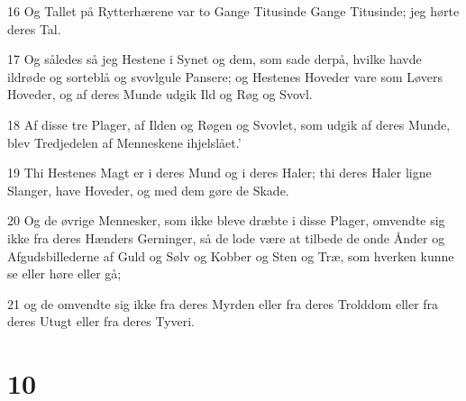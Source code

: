 \par 16 Og Tallet på Rytterhærene var to Gange Titusinde Gange Titusinde; jeg hørte deres Tal.
\par 17 Og således så jeg Hestene i Synet og dem, som sade derpå, hvilke havde ildrøde og sorteblå og svovlgule Pansere; og Hestenes Hoveder vare som Løvers Hoveder, og af deres Munde udgik Ild og Røg og Svovl.
\par 18 Af disse tre Plager, af Ilden og Røgen og Svovlet, som udgik af deres Munde, blev Tredjedelen af Menneskene ihjelslået.'
\par 19 Thi Hestenes Magt er i deres Mund og i deres Haler; thi deres Haler ligne Slanger, have Hoveder, og med dem gøre de Skade.
\par 20 Og de øvrige Mennesker, som ikke bleve dræbte i disse Plager, omvendte sig ikke fra deres Hænders Gerninger, så de lode være at tilbede de onde Ånder og Afgudsbillederne af Guld og Sølv og Kobber og Sten og Træ, som hverken kunne se eller høre eller gå;
\par 21 og de omvendte sig ikke fra deres Myrden eller fra deres Trolddom eller fra deres Utugt eller fra deres Tyveri.

\chapter{10}

